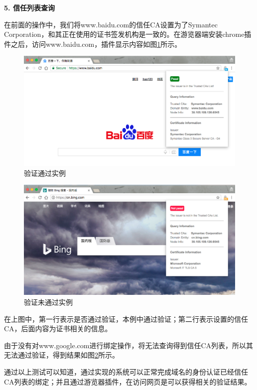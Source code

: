 \noindent\textbf{5. 信任列表查询}

在前面的操作中，我们将www.baidu.com的信任CA设置为了Symantec Corporation，和其正在使用的证书签发机构是一致的。在游览器端安装chrome插件之后，访问www.baidu.com，插件显示内容如图\ref{fig:pass}所示。

\begin{figure}[!htbp]
 	\centering
 	\includegraphics[scale=0.3]{img/pass}
 	\caption{验证通过实例}\label{fig:pass}
\end{figure}

\begin{figure}[!htbp]
 	\centering
 	\includegraphics[scale=0.3]{img/notPass}
 	\caption{验证未通过实例}\label{fig:notPass}
\end{figure}

在上图中，第一行表示是否通过验证，本例中通过验证；第二行表示设置的信任CA，后面内容为证书相关的信息。

由于没有对www.google.com进行绑定操作，将无法查询得到信任CA列表，所以其无法通过验证，得到结果如图\ref{fig:notPass}所示。

通过以上测试可以知道，通过实现的系统可以正常完成域名的身份认证已经信任CA列表的绑定；并且通过游览器插件，在访问网页是可以获得相关的验证结果。



